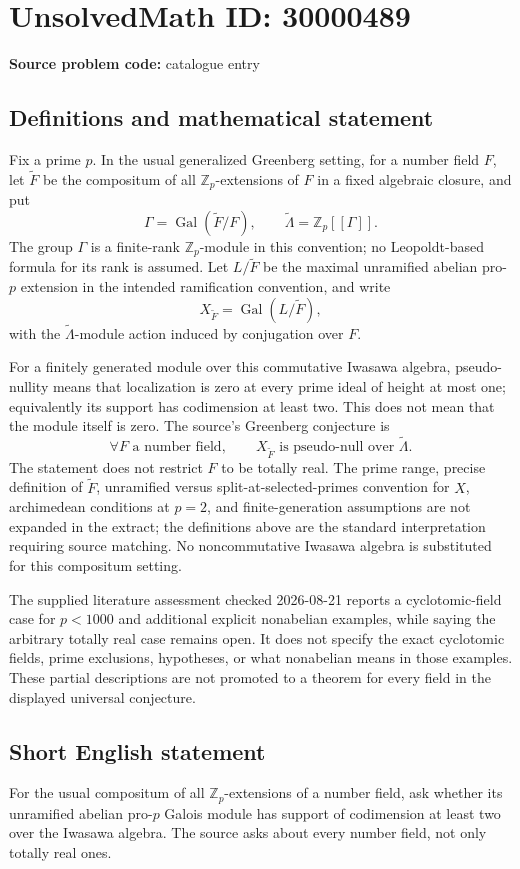 \documentclass[11pt]{article}
\newcommand{\Z}{\mathbb{Z}}
\begin{document}
\section*{UnsolvedMath ID: 30000489}
\textbf{Source problem code:} catalogue entry
\subsection{Definitions and mathematical statement}
Fix a prime \(p\). In the usual generalized Greenberg setting, for a number field \(F\), let \(\widetilde F\) be the compositum of all \(\Z_p\)-extensions of \(F\) in a fixed algebraic closure, and put
\[
\Gamma=\operatorname{Gal}(\widetilde F/F),\qquad
\widetilde\Lambda=\Z_p[[\Gamma]].
\]
The group \(\Gamma\) is a finite-rank \(\Z_p\)-module in this convention; no Leopoldt-based formula for its rank is assumed. Let \(L/\widetilde F\) be the maximal unramified abelian pro-\(p\) extension in the intended ramification convention, and write
\[
X_{\widetilde F}=\operatorname{Gal}(L/\widetilde F),
\]
with the \(\widetilde\Lambda\)-module action induced by conjugation over \(F\).

For a finitely generated module over this commutative Iwasawa algebra, pseudo-nullity means that localization is zero at every prime ideal of height at most one; equivalently its support has codimension at least two. This does not mean that the module itself is zero. The source's Greenberg conjecture is
\[
\forall F\text{ a number field},\qquad
X_{\widetilde F}\text{ is pseudo-null over }\widetilde\Lambda.
\]
The statement does not restrict \(F\) to be totally real. The prime range, precise definition of \(\widetilde F\), unramified versus split-at-selected-primes convention for \(X\), archimedean conditions at \(p=2\), and finite-generation assumptions are not expanded in the extract; the definitions above are the standard interpretation requiring source matching. No noncommutative Iwasawa algebra is substituted for this compositum setting.

The supplied literature assessment checked 2026-08-21 reports a cyclotomic-field case for \(p<1000\) and additional explicit nonabelian examples, while saying the arbitrary totally real case remains open. It does not specify the exact cyclotomic fields, prime exclusions, hypotheses, or what nonabelian means in those examples. These partial descriptions are not promoted to a theorem for every field in the displayed universal conjecture.
\subsection{Short English statement}
For the usual compositum of all \(\Z_p\)-extensions of a number field, ask whether its unramified abelian pro-\(p\) Galois module has support of codimension at least two over the Iwasawa algebra. The source asks about every number field, not only totally real ones.
\end{document}
